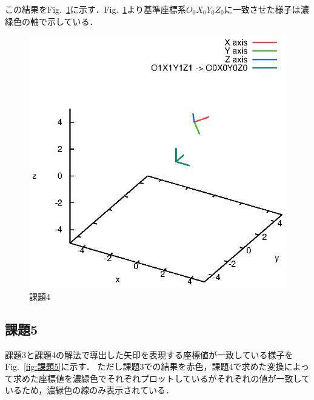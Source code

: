 \documentclass[a4paper,10pt]{jsarticle}
\begin{document}
この結果をFig.~\ref{fig:課題4}に示す．Fig.~\ref{fig:課題4}より基準座標系$O_0X_0Y_0Z_0$に一致させた様子は濃緑色の軸で示している．

\begin{figure}[b]
  \begin{center}
    \includegraphics[clip,width=14cm]{fig/eps/4.eps}
  \end{center}
  \caption{課題4}
  \label{fig:課題4}
\end{figure}

\subsection{課題5}
課題3と課題4の解法で導出した矢印を表現する座標値が一致している様子をFig.~\ref{fig:課題5}に示す．
ただし課題3での結果を赤色，課題4で求めた変換によって求めた座標値を濃緑色でそれぞれプロットしているがそれぞれの値が一致しているため，濃緑色の線のみ表示されている．
\end{document}
